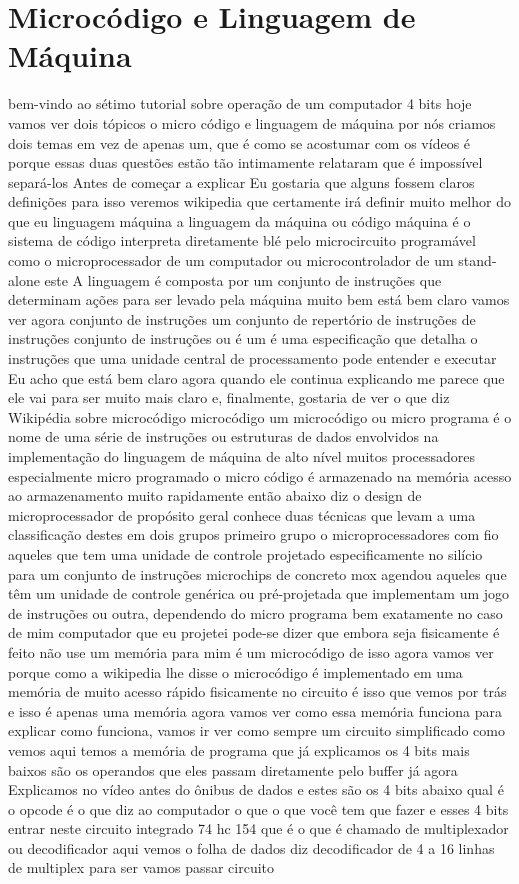 \documentclass[oneside,11pt]{memoir} %
\begin{document}
\chapter{Microcódigo e Linguagem de Máquina}
bem-vindo ao sétimo tutorial sobre  operação de um computador 4  bits hoje vamos ver dois tópicos o micro  código e linguagem de máquina por nós criamos  dois temas em vez de apenas um, que é como  se acostumar com os vídeos é porque  essas duas questões estão tão intimamente  relataram que é impossível separá-los  Antes de começar a explicar  Eu gostaria que alguns fossem claros  definições para isso veremos  wikipedia que certamente irá  definir muito melhor do que eu linguagem  máquina a linguagem da máquina ou código  máquina é o sistema de código  interpreta diretamente blé pelo  microcircuito programável como o  microprocessador de um computador ou  microcontrolador de um stand-alone este  A linguagem é composta por um conjunto  de instruções que determinam ações  para ser levado pela máquina muito bem  está bem claro vamos ver agora  conjunto de instruções um conjunto de  repertório de instruções de  instruções conjunto de instruções ou  é um  é uma especificação que detalha o  instruções que uma unidade central de  processamento pode entender e executar  Eu acho que está bem claro agora  quando ele continua explicando me parece que ele vai  para ser muito mais claro  e, finalmente, gostaria de ver o que diz  Wikipédia sobre microcódigo  microcódigo um microcódigo ou micro  programa é o nome de uma série de  instruções ou estruturas de dados  envolvidos na implementação do  linguagem de máquina de alto nível  muitos processadores especialmente  micro programado o micro código é  armazenado na memória acesso ao armazenamento  muito rapidamente então abaixo diz o  design de microprocessador de propósito  geral conhece duas técnicas que levam  a uma classificação destes em dois  grupos primeiro grupo o  microprocessadores com fio aqueles que  tem uma unidade de controle  projetado especificamente no  silício para um conjunto de instruções  microchips de concreto mox  agendou aqueles que têm um  unidade de controle genérica ou pré-projetada  que implementam um jogo de  instruções ou outra, dependendo do  micro programa  bem exatamente no caso de mim  computador que eu projetei  pode-se dizer que embora seja  fisicamente é feito não use um  memória para mim é um microcódigo de  isso agora vamos ver porque  como a wikipedia lhe disse o microcódigo  é implementado em uma memória de muito  acesso rápido fisicamente no circuito  é isso que vemos por trás  e isso é apenas uma memória agora  vamos ver como essa memória funciona  para explicar como funciona, vamos  ir ver como sempre um circuito  simplificado  como vemos aqui temos a memória de  programa que já explicamos os 4 bits  mais baixos são os operandos que eles passam  diretamente pelo buffer já agora  Explicamos no vídeo antes do ônibus  de dados e estes são os 4 bits  abaixo qual é o opcode  é o que diz ao computador o que  o que você tem que fazer e esses 4 bits  entrar neste circuito integrado 74 hc  154 que é o que é chamado de  multiplexador ou decodificador aqui vemos o  folha de dados diz decodificador de 4 a 16 linhas  de multiplex para ser vamos passar circuito  
\end{document}

